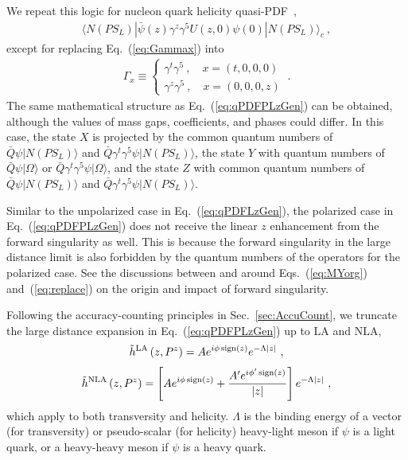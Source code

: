 \documentclass[a4paper,11pt]{article}
\begin{document}
We repeat this logic for nucleon quark helicity quasi-PDF~\cite{Alexandrou:2021oih},
\begin{align}\label{eq:qPDFPH}
\langle N(P S_{L}) | \bar{\psi}(z) \gamma^z \gamma^5  U(z,0) \psi(0) | N(P S_{L}) \rangle_{c} \ ,
\end{align}
except for replacing Eq.~(\ref{eq:Gammax}) into 
\begin{align}
\Gamma_x \equiv 
\begin{cases}
\gamma^t \gamma^5 \ , \quad x=(t,0,0,0) \\
\gamma^z \gamma^5 \ , \quad x=(0,0,0,z)
\end{cases} \ .
\end{align}
The same mathematical structure as Eq.~(\ref{eq:qPDFPLzGen}) can be obtained, although the values of mass gaps, coefficients, and phases could differ. In this case, the state $X$ is projected by the common quantum numbers of $\bar{Q} \psi | N(P S_{L}) \rangle$ and $\bar{Q} \gamma^t \gamma^5 \psi | N(P S_{L}) \rangle$, the state $Y$ with quantum numbers of $\bar{Q}  \psi | \Omega \rangle$ or $\bar{Q} \gamma^t \gamma^5 \psi | \Omega \rangle$, and the state $Z$ with common quantum numbers of $\bar{Q} \psi | N(P S_{L}) \rangle$ and $\bar{Q} \gamma^t \gamma^5 \psi | N(P S_{L}) \rangle$.

Similar to the unpolarized case in Eq.~(\ref{eq:qPDFLzGen}), the polarized case in Eq.~(\ref{eq:qPDFPLzGen}) does not receive the linear $z$ enhancement from the forward singularity as well. This is because the forward singularity in the large distance limit is also forbidden by the quantum numbers of the operators for the polarized case. See the discussions between and around Eqs.~(\ref{eq:MYorg}) and~(\ref{eq:replace}) on the origin and impact of forward singularity.

Following the accuracy-counting principles in Sec.~\ref{sec:AccuCount}, we truncate the large distance expansion in Eq.~(\ref{eq:qPDFPLzGen}) up to LA and NLA,
\begin{align}
\tilde{h}^{\rm LA}\left(z,P^z\right) = 
A e^{i \phi \, {\rm sign}(z)} e^{-\Lambda |z|}  \ ,
\end{align}
\begin{align}
\tilde{h}^{\rm NLA}\left(z,P^z\right) = 
\left[A e^{i \phi \, {\rm sign}(z)} +  \frac{A' e^{i \phi' \, {\rm sign}(z)}}{|z|} \right] e^{-\Lambda |z|}  \ ,
\end{align}
which apply to both transversity and helicity. $\Lambda$ is the binding energy of a vector (for transversity) or pseudo-scalar (for helicity) heavy-light meson if $\psi$ is a light quark, or a heavy-heavy meson if $\psi$ is a heavy quark.
\end{document}
